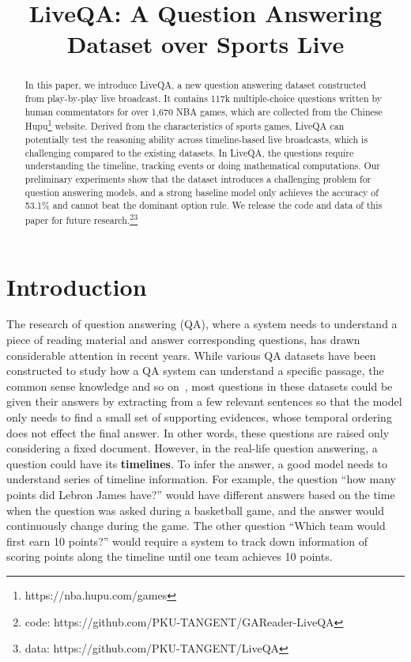 \title{LiveQA: A Question Answering Dataset over Sports Live}



\maketitle
\begin{abstract}
In this paper, we introduce LiveQA, a new question answering dataset constructed from play-by-play live broadcast. It contains 117k multiple-choice questions written by human commentators for over 1,670 NBA games, which are collected from the Chinese Hupu\footnote{https://nba.hupu.com/games} website. Derived from the characteristics of sports games, %
LiveQA can potentially  test the  reasoning ability across timeline-based live broadcasts, 
which is challenging compared to the existing datasets.
In LiveQA, the questions require understanding the timeline, tracking events or doing mathematical computations. 
Our preliminary experiments show that the dataset introduces a challenging problem for question answering models, and  a strong baseline model only achieves the accuracy of 53.1\%  and cannot beat the dominant option rule. 
We release the code and data of this paper for future research.\footnote{code: https://github.com/PKU-TANGENT/GAReader-LiveQA}\footnote{data: https://github.com/PKU-TANGENT/LiveQA}
\end{abstract}

\section{Introduction}

The research of question answering (QA), where a system needs to understand a piece of reading material and answer corresponding questions, has drawn considerable attention in recent years. While various QA datasets have been constructed to study how a QA system can understand a specific passage, the common sense knowledge and so on~\cite{rajpurkar2016squad,lai2017race,dunn2017searchqa,rajpurkar2018know}, %
most questions in these datasets could be given their answers by extracting from a few relevant sentences so that the model only needs to find a small set of supporting evidences,%
whose temporal ordering  does not effect the final answer. 
In other words, these questions are raised only considering a fixed document. However, in the real-life question answering, a question could have its \textbf{timelines}. To  infer the answer, a good model needs to understand series of timeline information. For example, the question ``how many points did Lebron James have?'' would have different answers based on the time when the question was asked during a basketball game, and the answer would continuously change during the game. The other question ``Which team would first earn 10 points?'' would require a system to track down information of scoring points along the timeline until one team achieves 10 points.

